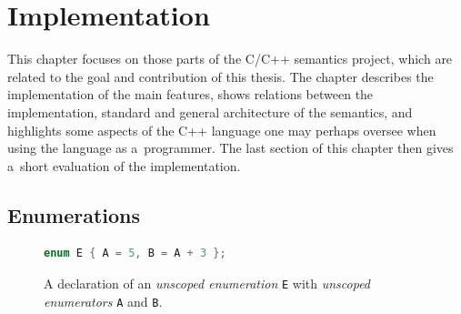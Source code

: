 \documentclass{fithesis3}
\begin{document}




\chapter{Implementation}

This chapter focuses on those parts of the C/C++ semantics project, which are related to the goal and contribution of this thesis. The chapter describes the implementation of the main features, shows relations between the implementation, standard and general architecture of the semantics, and highlights some aspects of the C++ language one may perhaps oversee when using the language as a~programmer. The last section of this chapter then gives a~short evaluation of the implementation.

	


\section{Enumerations}



\begin{figure}
\begin{lstlisting}[language=C++]
enum E { A = 5, B = A + 3 };
\end{lstlisting}
\caption{A declaration of an \textit{unscoped enumeration} \texttt{E} with \textit{unscoped enumerators} \texttt{A} and \texttt{B}.}
\end{figure}
\end{document}
